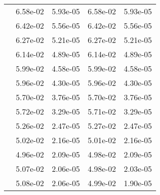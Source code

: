 \begin{table}
\begin{tabular}{c|cc|cc|}
\multicolumn{1}{|c|}{} & \multicolumn{1}{|c|}{  6.58e-02} & \multicolumn{1}{|c|}{  5.93e-05} & \multicolumn{1}{|c|}{  6.58e-02} & \multicolumn{1}{|c|}{  5.93e-05} \\ 
\multicolumn{1}{|c|}{} & \multicolumn{1}{|c|}{  6.42e-02} & \multicolumn{1}{|c|}{  5.56e-05} & \multicolumn{1}{|c|}{  6.42e-02} & \multicolumn{1}{|c|}{  5.56e-05} \\ 
\multicolumn{1}{|c|}{} & \multicolumn{1}{|c|}{  6.27e-02} & \multicolumn{1}{|c|}{  5.21e-05} & \multicolumn{1}{|c|}{  6.27e-02} & \multicolumn{1}{|c|}{  5.21e-05} \\ 
\multicolumn{1}{|c|}{} & \multicolumn{1}{|c|}{  6.14e-02} & \multicolumn{1}{|c|}{  4.89e-05} & \multicolumn{1}{|c|}{  6.14e-02} & \multicolumn{1}{|c|}{  4.89e-05} \\ 
\multicolumn{1}{|c|}{} & \multicolumn{1}{|c|}{  5.99e-02} & \multicolumn{1}{|c|}{  4.58e-05} & \multicolumn{1}{|c|}{  5.99e-02} & \multicolumn{1}{|c|}{  4.58e-05} \\ 
\multicolumn{1}{|c|}{} & \multicolumn{1}{|c|}{  5.96e-02} & \multicolumn{1}{|c|}{  4.30e-05} & \multicolumn{1}{|c|}{  5.96e-02} & \multicolumn{1}{|c|}{  4.30e-05} \\ 
\multicolumn{1}{|c|}{} & \multicolumn{1}{|c|}{  5.70e-02} & \multicolumn{1}{|c|}{  3.76e-05} & \multicolumn{1}{|c|}{  5.70e-02} & \multicolumn{1}{|c|}{  3.76e-05} \\ 
\multicolumn{1}{|c|}{} & \multicolumn{1}{|c|}{  5.72e-02} & \multicolumn{1}{|c|}{  3.29e-05} & \multicolumn{1}{|c|}{  5.71e-02} & \multicolumn{1}{|c|}{  3.29e-05} \\ 
\multicolumn{1}{|c|}{} & \multicolumn{1}{|c|}{  5.26e-02} & \multicolumn{1}{|c|}{  2.47e-05} & \multicolumn{1}{|c|}{  5.27e-02} & \multicolumn{1}{|c|}{  2.47e-05} \\ 
\multicolumn{1}{|c|}{} & \multicolumn{1}{|c|}{  5.02e-02} & \multicolumn{1}{|c|}{  2.16e-05} & \multicolumn{1}{|c|}{  5.01e-02} & \multicolumn{1}{|c|}{  2.16e-05} \\ 
\multicolumn{1}{|c|}{} & \multicolumn{1}{|c|}{  4.96e-02} & \multicolumn{1}{|c|}{  2.09e-05} & \multicolumn{1}{|c|}{  4.98e-02} & \multicolumn{1}{|c|}{  2.09e-05} \\ 
\multicolumn{1}{|c|}{} & \multicolumn{1}{|c|}{  5.07e-02} & \multicolumn{1}{|c|}{  2.06e-05} & \multicolumn{1}{|c|}{  4.98e-02} & \multicolumn{1}{|c|}{  2.03e-05} \\ 
\multicolumn{1}{|c|}{} & \multicolumn{1}{|c|}{  5.08e-02} & \multicolumn{1}{|c|}{  2.06e-05} & \multicolumn{1}{|c|}{  4.99e-02} & \multicolumn{1}{|c|}{  1.90e-05} \\ 

\end{tabular}
\end{table}
